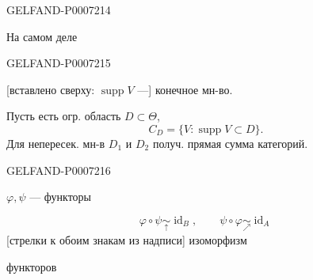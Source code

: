 \begin{GelfandAdjacentEvidence}{GELFAND-P000721}{4}


На самом деле
\end{GelfandAdjacentEvidence}
\begin{GelfandAdjacentEvidence}{GELFAND-P000721}{5}

[вставлено сверху: \(\operatorname{supp}V\) ---] конечное мн-во.

Пусть есть огр. область \(D\subset\Theta\),
\[
C_D=\{V:\operatorname{supp}V\subset D\}.
\]
Для непересек. мн-в \(D_1\) и \(D_2\) получ. прямая сумма категорий.

\end{GelfandAdjacentEvidence}
\begin{GelfandAdjacentEvidence}{GELFAND-P000721}{6}


\(\varphi,\psi\) --- функторы

\[
\varphi\circ\psi\underset{\uparrow}{\sim}\operatorname{id}_B,
\qquad
\psi\circ\varphi\underset{\nearrow}{\sim}\operatorname{id}_A
\]
[стрелки к обоим знакам из надписи] изоморфизм
\end{GelfandAdjacentEvidence}

функторов


